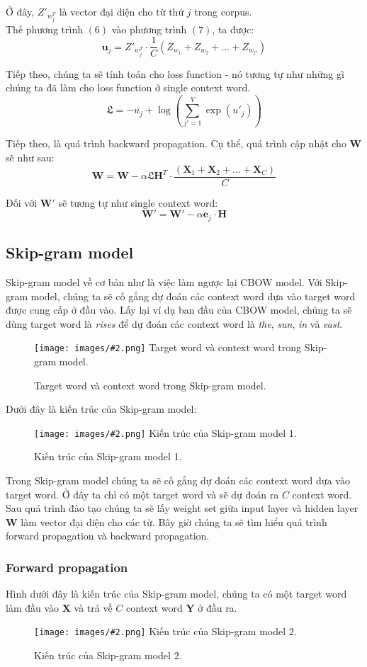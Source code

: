 \documentclass[12pt]{article}
\newcommand{\includeImage}[3]{
\begin{figure}[H]
  \centering
  \texttt{[image: images/\#2.png]}
  \def\temp{#3}\ifx\temp\empty\else\caption{#3}\fi
\end{figure}}
\begin{document}
\indent Ở đây, $Z'_{w_j^T}$ là vector đại diện cho từ thứ $j$ trong corpus.\\

\indent Thế phương trình $(6)$ vào phương trình $(7)$, ta được:
$$\boldsymbol{u}_j = Z'_{w_j^T} \cdot \dfrac{1}{C} (Z_{w_1} + Z_{w_2} + \hdots + Z_{w_C})$$

\indent Tiếp theo, chúng ta sẽ tính toán cho loss function - nó tương tự như những gì chúng ta đã làm cho loss function ở single context word.
$$\mathfrak{L} = -u_j + \log{\left ( \sum_{j'=1}^V \exp{(u'_j)} \right )}$$

\indent Tiếp theo, là quá trình backward propagation. Cụ thể, quá trình cập nhật cho $\boldsymbol{W}$ sẽ như sau:
$$\boldsymbol{W} = \boldsymbol{W} - \alpha \mathfrak{L} \boldsymbol{H}^T \cdot \dfrac{(\boldsymbol{X}_1 + \boldsymbol{X}_2 + \hdots + \boldsymbol{X}_C)}{C}$$

\indent Đối với $\boldsymbol{W'}$ sẽ tương tự như single context word:
$$\boldsymbol{W'} = \boldsymbol{W'} - \alpha \boldsymbol{e}_j \cdot \boldsymbol{H}$$

\subsection{Skip-gram model}
Skip-gram model về cơ bản như là việc làm ngược lại CBOW model. Với Skip-gram model, chúng ta sẽ cố gắng dự đoán các context word dựa vào target word được cung cấp ở đầu vào. Lấy lại ví dụ ban đầu của CBOW model, chúng ta sẽ dùng target word là \textsl{rises} để dự đoán các context word là \textsl{the}, \textsl{sun}, \textsl{in} và \textsl{east}.

\includeImage{0.7}{04}{Target word và context word trong Skip-gram model.}

\indent Dưới đây là kiến trúc của Skip-gram model:
\includeImage{1}{09}{Kiến trúc của Skip-gram model 1.}

\indent Trong Skip-gram model chúng ta sẽ cố gắng dự đoán các context word dựa vào target word. Ở đây ta chỉ có một target word và sẽ dự đoán ra $C$ context word. Sau quá trình đào tạo chúng ta sẽ lấy weight set giữa input layer và hidden layer $\boldsymbol{W}$ làm vector đại diện cho các từ. Bây giờ chúng ta sẽ tìm hiểu quá trình forward propagation và backward propagation.

\subsubsection{Forward propagation}
Hình dưới đây là kiến trúc của Skip-gram model, chúng ta có một target word làm đầu vào $\boldsymbol{X}$ và trả về $C$ context word $\boldsymbol{Y}$ ở đầu ra.
\includeImage{1}{10}{Kiến trúc của Skip-gram model 2.}
\end{document}
